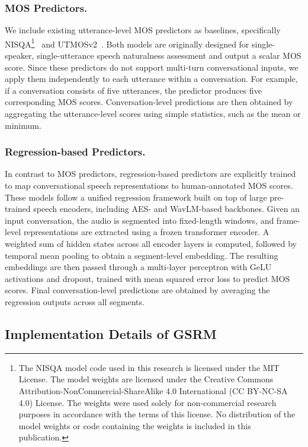 \subsubsection{MOS Predictors.}
We include existing utterance-level MOS predictors as baselines, specifically NISQA\footnote{The NISQA model code used in this research is licensed under the MIT License. The model weights are licensed under the Creative Commons Attribution-NonCommercial-ShareAlike 4.0 International (CC BY-NC-SA 4.0) License. The weights were used solely for non-commercial research purposes in accordance with the terms of this license. No distribution of the model weights or code containing the weights is included in this publication.}~\cite{mittag2021nisqa} and UTMOSv2~\cite{baba2024utmosv2}. Both models are originally designed for single-speaker, single-utterance speech naturalness assessment and output a scalar MOS score. Since these predictors do not support multi-turn conversational inputs, we apply them independently to each utterance within a conversation. For example, if a conversation consists of five utterances, the predictor produces five corresponding MOS scores. Conversation-level predictions are then obtained by aggregating the utterance-level scores using simple statistics, such as the mean or minimum.

\subsubsection{Regression-based Predictors.}
In contrast to MOS predictors, regression-based predictors are explicitly trained to map conversational speech representations to human-annotated MOS scores. These models follow a unified regression framework built on top of large pre-trained speech encoders, including AES- and WavLM-based backbones. Given an input conversation, the audio is segmented into fixed-length windows, and frame-level representations are extracted using a frozen transformer encoder. A weighted sum of hidden states across all encoder layers is computed, followed by temporal mean pooling to obtain a segment-level embedding. The resulting embeddings are then passed through a multi-layer perceptron with GeLU activations and dropout, trained with mean squared error loss to predict MOS scores. Final conversation-level predictions are obtained by averaging the regression outputs across all segments.


\subsection{Implementation Details of GSRM}

